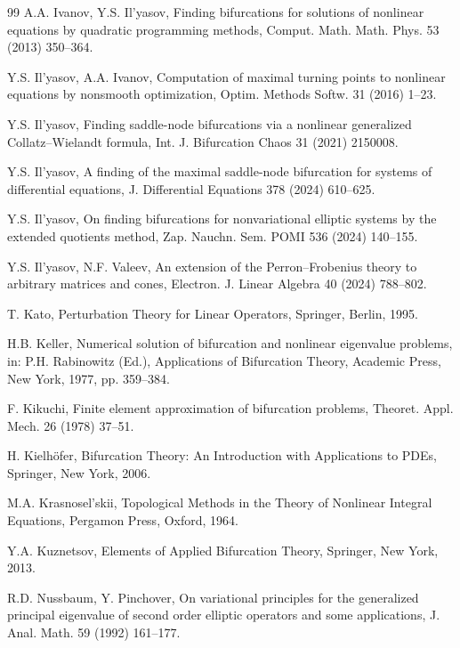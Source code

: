 \documentclass[preprint,10pt]{elsarticle}
\numberwithin{equation}{section}
\begin{document}
\begin{thebibliography}{99}
	A.A. Ivanov, Y.S. Il'yasov, Finding bifurcations for solutions of nonlinear
	equations by quadratic programming methods, Comput. Math. Math. Phys. 53
	(2013) 350--364.
	
	Y.S. Il'yasov, A.A. Ivanov, Computation of maximal turning points to nonlinear
	equations by nonsmooth optimization, Optim. Methods Softw. 31 (2016) 1--23.
	
	Y.S. Il'yasov, Finding saddle-node bifurcations via a nonlinear generalized
	Collatz--Wielandt formula, Int. J. Bifurcation Chaos 31 (2021) 2150008.
	
	Y.S. Il'yasov, A finding of the maximal saddle-node bifurcation for systems of
	differential equations, J. Differential Equations 378 (2024) 610--625.
	
	Y.S. Il'yasov, On finding bifurcations for nonvariational elliptic systems by
	the extended quotients method, Zap. Nauchn. Sem. POMI 536 (2024) 140--155.
	
	Y.S. Il'yasov, N.F. Valeev, An extension of the Perron--Frobenius theory to
	arbitrary matrices and cones, Electron. J. Linear Algebra 40 (2024) 788--802.
	
	T. Kato, Perturbation Theory for Linear Operators, Springer, Berlin, 1995.
	
	H.B. Keller, Numerical solution of bifurcation and nonlinear eigenvalue
	problems, in: P.H. Rabinowitz (Ed.), Applications of Bifurcation Theory,
	Academic Press, New York, 1977, pp. 359--384.
	
	F. Kikuchi, Finite element approximation of bifurcation problems, Theoret.
	Appl. Mech. 26 (1978) 37--51.
	
	H. Kielh\"ofer, Bifurcation Theory: An Introduction with Applications to PDEs,
	Springer, New York, 2006.
	
	M.A. Krasnosel'skii, Topological Methods in the Theory of Nonlinear Integral
	Equations, Pergamon Press, Oxford, 1964.
	
	Y.A. Kuznetsov, Elements of Applied Bifurcation Theory, Springer, New York,
	2013.
	
	R.D. Nussbaum, Y. Pinchover, On variational principles for the generalized
	principal eigenvalue of second order elliptic operators and some applications,
	J. Anal. Math. 59 (1992) 161--177.
	

\end{thebibliography}
\end{document}

